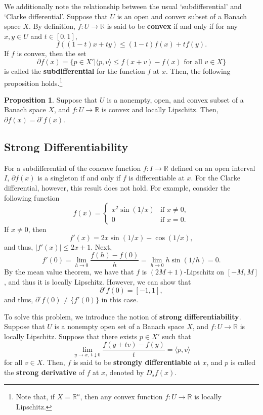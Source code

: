 \documentclass[a4paper,12pt]{article}
\theoremstyle{definition}
\newtheorem{prop}{Proposition}
\begin{document}
We additionally note the relationship between the usual `subdifferential' and `Clarke differential'. Suppose that $U$ is an open and convex subset of a Banach space $X$. By definition, $f:U\to \mathbb{R}$ is said to be {\bf convex} if and only if for any $x,y\in U$ and $t\in [0,1]$,
\[f((1-t)x+ty)\le (1-t)f(x)+tf(y).\]
If $f$ is convex, then the set
\[\partial f(x)=\{p\in X'|\langle p,v\rangle \le f(x+v)-f(x)\mbox{ for all }v\in X\}\]
is called the {\bf subdifferential} for the function $f$ at $x$. Then, the following proposition holds.\footnote{Note that, if $X=\mathbb{R}^n$, then any convex function $f:U\to \mathbb{R}$ is locally Lipschitz.}

\begin{prop}\label{prop4}
Suppose that $U$ is a nonempty, open, and convex subset of a Banach space $X$, and $f:U\to \mathbb{R}$ is convex and locally Lipschitz. Then, $\partial f(x)=\partial^{\circ}f(x)$.
\end{prop}



\subsection{Strong Differentiability}
For a subdifferential of the concave function $f:I\to \mathbb{R}$ defined on an open interval $I$, $\partial f(x)$ is a singleton if and only if $f$ is differentiable at $x$. For the Clarke differential, however, this result does not hold. For example, consider the following function
\[f(x)=\begin{cases}
x^2\sin(1/x) & \mbox{if }x\neq 0,\\
0 & \mbox{if }x=0.
\end{cases}\]
If $x\neq 0$, then
\[f'(x)=2x\sin(1/x)-\cos(1/x),\]
and thus, $|f'(x)|\le 2x+1$. Next,
\[f'(0)=\lim_{h\to 0}\frac{f(h)-f(0)}{h}=\lim_{h\to 0}h\sin(1/h)=0.\]
By the mean value theorem, we have that $f$ is $(2M+1)$-Lipschitz on $[-M,M]$, and thus it is locally Lipschitz. However, we can show that
\[\partial^{\circ}f(0)=[-1,1],\]
and thus, $\partial^{\circ}f(0)\neq \{f'(0)\}$ in this case.

To solve this problem, we introduce the notion of {\bf strong differentiability}. Suppose that $U$ is a nonempty open set of a Banach space $X$, and $f:U\to \mathbb{R}$ is locally Lipschitz. Suppose that there exists $p\in X'$ such that
\[\lim_{y\to x,\ t\downarrow 0}\frac{f(y+tv)-f(y)}{t}=\langle p,v\rangle\]
for all $v\in X$. Then, $f$ is said to be {\bf strongly differentiable} at $x$, and $p$ is called the {\bf strong derivative} of $f$ at $x$, denoted by $D_sf(x)$.
\end{document}
